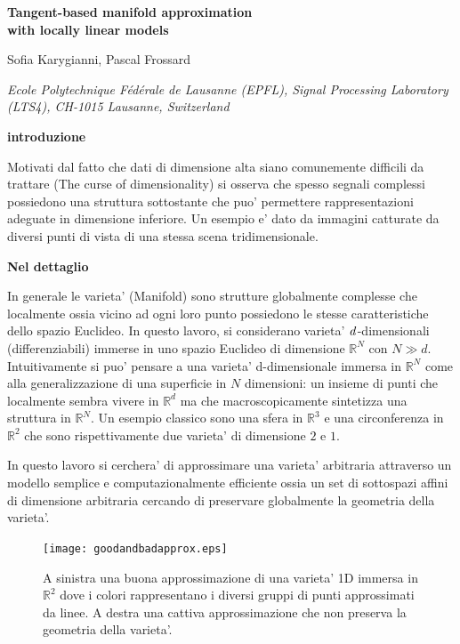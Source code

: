 \documentclass{seminar}
\theoremstyle{definition}
\newcommand{\RR}{\mathbb{R}}
\def\bc{\begin{center}}
\def\ec{\end{center}}
\def\bs{\begin{slide}\begingroup\small}
\def\es{\endgroup\end{slide}}
\begin{document}
\large

\bs
\bc{\bf\color{blue}Tangent-based manifold approximation \\with locally linear models}\ec

\vskip 0.2in

\bc{{\color{red} Sofia Karygianni, Pascal Frossard}}\ec

\vskip 0.2in

\bc{\footnotesize \it Ecole Polytechnique Fédérale de Lausanne (EPFL), Signal Processing Laboratory (LTS4), CH-1015 Lausanne, Switzerland}\ec
\es

\bs
\bc{\bf\color{blue}introduzione}\ec
Motivati dal fatto che dati di dimensione alta siano comunemente difficili da trattare (The curse of dimensionality) si osserva che spesso segnali complessi possiedono una struttura sottostante che puo' permettere rappresentazioni adeguate in dimensione inferiore.
\vskip 0.2in
Un esempio e' dato da immagini catturate da diversi punti di vista di una stessa scena tridimensionale.
\es

\bs
\bc{\bf\color{blue}Nel dettaglio}\ec
In generale le varieta' (Manifold) sono strutture globalmente complesse che localmente ossia vicino ad ogni loro punto possiedono le stesse caratteristiche dello spazio Euclideo. In questo lavoro, si considerano varieta' $\it d$-dimensionali (differenziabili) immerse in uno spazio Euclideo di dimensione $\RR^{N}$ con $N \gg d$.
	Intuitivamente si puo' pensare a una varieta' d-dimensionale immersa in $\RR^{N}$ come alla generalizzazione di una superficie in $N$ dimensioni: un insieme di punti che localmente sembra vivere in $\RR^{d}$ ma che macroscopicamente sintetizza una struttura in $\RR^{N}$.
\vskip 0.2in
Un esempio classico sono una sfera in $\RR^{3}$ e una circonferenza in $\RR^{2}$ che sono rispettivamente due varieta' di dimensione $2$ e $1$.
\es

\bs
In questo lavoro si cerchera' di approssimare una varieta' arbitraria attraverso un modello semplice e computazionalmente efficiente ossia un set di sottospazi affini di dimensione arbitraria cercando di preservare globalmente la geometria della varieta'.


\begin{figure}[b]
\centering
\texttt{[image: goodandbadapprox.eps]}
\caption{A sinistra una buona approssimazione di una varieta' 1D immersa in $\RR^{2}$ dove i colori rappresentano i diversi gruppi di punti approssimati da linee. A destra una cattiva approssimazione che non preserva la geometria della varieta'.}
\end{figure}
\es
\end{document}
